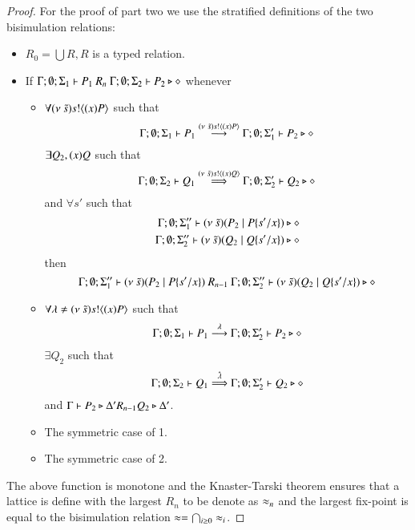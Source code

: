 \begin{proof}

	For the proof of part two we use the stratified definitions of the two bisimulation relations:

	\begin{itemize}
		\item	$R_0 = \bigcup R, R$ is a typed relation.
		\item	If $\Gamma; \emptyset; \Sigma_1 \vdash P_1\ R_n\ \Gamma; \emptyset; \Sigma_2 \vdash P_2 \triangleright \diamond$
			whenever
			\begin{itemize}
				\item	$\forall (\nu\ \tilde{s}) s ! \langle (x)P \rangle$ such that
					\[
						\Gamma; \emptyset; \Sigma_1 \vdash P_1 \stackrel{(\nu\ \tilde{s}) s ! \langle (x)P \rangle}{\longrightarrow} \Gamma; \emptyset; \Sigma_1' \vdash P_2 \triangleright \diamond
					\]
					$\exists Q_2, (x)Q$ such that
					\[
						\Gamma; \emptyset; \Sigma_2 \vdash Q_1 \stackrel{(\nu\ \tilde{s}) s ! \langle (x)Q \rangle}{\Longrightarrow} \Gamma; \emptyset; \Sigma_2' \vdash Q_2 \triangleright \diamond
					\]
					and $\forall s'$
					such that
					\begin{eqnarray*}
						\Gamma; \emptyset; \Sigma_1'' \vdash (\nu\ \tilde{s})(P_2 \;|\; P \{s'/x \}) \triangleright \diamond \\
						\Gamma; \emptyset; \Sigma_2'' \vdash (\nu\ \tilde{s})(Q_2 \;|\; Q \{s'/x \}) \triangleright \diamond
					\end{eqnarray*}
					then
					\[
						\Gamma; \emptyset; \Sigma_1'' \proves \newsp{\tilde{s}}{P_2 \Par P \subst{s'}{x}}\ R_{n-1}\ 
						\Gamma; \emptyset; \Sigma_2'' \proves \newsp{\tilde{s}}{Q_2 \Par Q \subst{s'}{x}} \hastype \Proc
					\]

				\item	$\forall \lambda \not= (\nu\ \tilde{s}) s ! \langle (x)P \rangle$ such that
					\[
						\Gamma; \emptyset; \Sigma_1 \vdash P_1 \stackrel{\lambda}{\longrightarrow} \Gamma; \emptyset; \Sigma_2' \vdash P_2 \triangleright \diamond
					\]
					$\exists Q_2$ such that 
					\[
						\Gamma; \emptyset; \Sigma_2 \vdash Q_1 \stackrel{\hat{\lambda}}{\Longrightarrow} \Gamma; \emptyset; \Sigma_2' \vdash Q_2 \triangleright \diamond
					\]
					and
					$\Gamma \vdash P_2 \triangleright \Delta' R_{n-1} Q_2 \triangleright \Delta'$.

				\item	The symmetric case of 1.
				\item	The symmetric case of 2.
			\end{itemize}
	\end{itemize}
	\noi The above function is monotone and the Knaster-Tarski theorem ensures that a lattice is define
	with the largest $R_n$ to be denote as $\approx_n$ and the largest fix-point is equal to the bisimulation relation $\approx = \bigcap_{i \geq 0} \approx_i$.


\end{proof}
